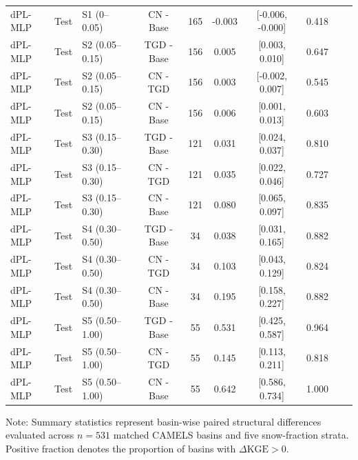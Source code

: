 \begin{table}[t]
\begin{threeparttable}
\begin{tabular}{lllccccccc}
dPL-MLP & Test & S1 (0–0.05) & CN - Base & 165 & -0.003 & [-0.006, -0.000] & 0.418 \\
dPL-MLP & Test & S2 (0.05–0.15) & TGD - Base & 156 & 0.005 & [0.003, 0.010] & 0.647 \\
dPL-MLP & Test & S2 (0.05–0.15) & CN - TGD & 156 & 0.003 & [-0.002, 0.007] & 0.545 \\
dPL-MLP & Test & S2 (0.05–0.15) & CN - Base & 156 & 0.006 & [0.001, 0.013] & 0.603 \\
dPL-MLP & Test & S3 (0.15–0.30) & TGD - Base & 121 & 0.031 & [0.024, 0.037] & 0.810 \\
dPL-MLP & Test & S3 (0.15–0.30) & CN - TGD & 121 & 0.035 & [0.022, 0.046] & 0.727 \\
dPL-MLP & Test & S3 (0.15–0.30) & CN - Base & 121 & 0.080 & [0.065, 0.097] & 0.835 \\
dPL-MLP & Test & S4 (0.30–0.50) & TGD - Base & 34 & 0.038 & [0.031, 0.165] & 0.882 \\
dPL-MLP & Test & S4 (0.30–0.50) & CN - TGD & 34 & 0.103 & [0.043, 0.129] & 0.824 \\
dPL-MLP & Test & S4 (0.30–0.50) & CN - Base & 34 & 0.195 & [0.158, 0.227] & 0.882 \\
dPL-MLP & Test & S5 (0.50–1.00) & TGD - Base & 55 & 0.531 & [0.425, 0.587] & 0.964 \\
dPL-MLP & Test & S5 (0.50–1.00) & CN - TGD & 55 & 0.145 & [0.113, 0.211] & 0.818 \\
dPL-MLP & Test & S5 (0.50–1.00) & CN - Base & 55 & 0.642 & [0.586, 0.734] & 1.000 \\
\bottomrule
\end{tabular}
\begin{tablenotes}
\small
\item Note: Summary statistics represent basin-wise paired structural differences evaluated across $n = 531$ matched CAMELS basins and five snow-fraction strata. Positive fraction denotes the proportion of basins with $\Delta\text{KGE} > 0$.
\end{tablenotes}
\end{threeparttable}
\end{table}
